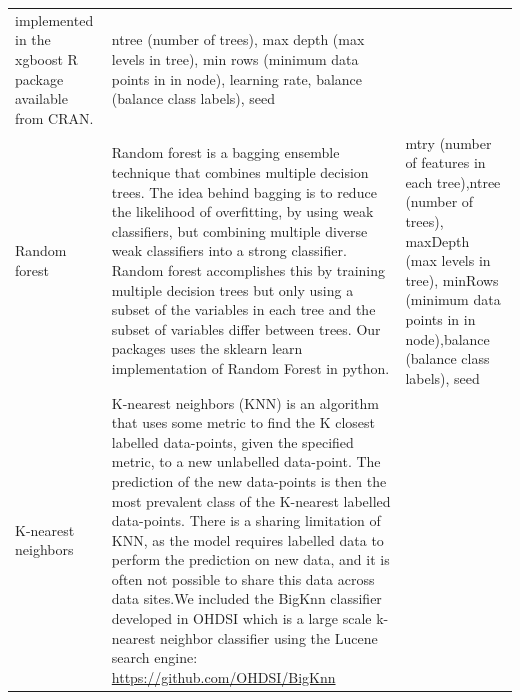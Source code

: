\documentclass[
]{article}
\begin{document}
\begin{longtable}[]{@{}lll@{}}
\begin{minipage}[t]{0.55\columnwidth}
implemented in the xgboost R package available from CRAN.\strut
\end{minipage} & \begin{minipage}[t]{0.25\columnwidth}\raggedright
ntree (number of trees), max depth (max levels in tree), min rows
(minimum data points in in node), learning rate, balance (balance class
labels), seed\strut
\end{minipage}\tabularnewline
\begin{minipage}[t]{0.11\columnwidth}\raggedright
Random forest\strut
\end{minipage} & \begin{minipage}[t]{0.55\columnwidth}\raggedright
Random forest is a bagging ensemble technique that combines multiple
decision trees. The idea behind bagging is to reduce the likelihood of
overfitting, by using weak classifiers, but combining multiple diverse
weak classifiers into a strong classifier. Random forest accomplishes
this by training multiple decision trees but only using a subset of the
variables in each tree and the subset of variables differ between trees.
Our packages uses the sklearn learn implementation of Random Forest in
python.\strut
\end{minipage} & \begin{minipage}[t]{0.25\columnwidth}\raggedright
mtry (number of features in each tree),ntree (number of trees), maxDepth
(max levels in tree), minRows (minimum data points in in node),balance
(balance class labels), seed\strut
\end{minipage}\tabularnewline
\begin{minipage}[t]{0.11\columnwidth}\raggedright
K-nearest neighbors\strut
\end{minipage} & \begin{minipage}[t]{0.55\columnwidth}\raggedright
K-nearest neighbors (KNN) is an algorithm that uses some metric to find
the K closest labelled data-points, given the specified metric, to a new
unlabelled data-point. The prediction of the new data-points is then the
most prevalent class of the K-nearest labelled data-points. There is a
sharing limitation of KNN, as the model requires labelled data to
perform the prediction on new data, and it is often not possible to
share this data across data sites.We included the BigKnn classifier
developed in OHDSI which is a large scale k-nearest neighbor classifier
using the Lucene search engine:
\url{https://github.com/OHDSI/BigKnn}\strut
\end{minipage} & \begin{minipage}[t]{0.25\columnwidth}\raggedright

\end{minipage}
\end{longtable}
\end{document}
